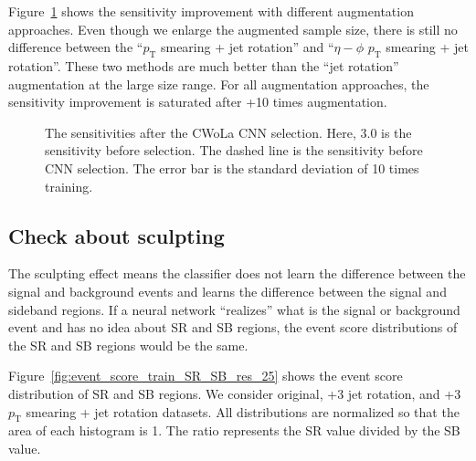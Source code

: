 \documentclass[12pt]{article}
\begin{document}
        Figure~\ref{fig:sensitivity_improvement_summary_aug_3_to_33_SB_3} shows the sensitivity improvement with different augmentation approaches. Even though we enlarge the augmented sample size, there is still no difference between the ``$p_{\text{T}}$ smearing + jet rotation'' and ``$\eta-\phi$ $p_{\text{T}}$ smearing + jet rotation''. These two methods are much better than the ``jet rotation'' augmentation at the large size range. For all augmentation approaches, the sensitivity improvement is saturated after +10 times augmentation.
        \begin{figure}[htpb]
            \centering
            \caption{The sensitivities after the CWoLa CNN selection. Here, $3.0$ is the sensitivity before selection. The dashed line is the sensitivity before CNN selection. The error bar is the standard deviation of 10 times training.}
            \label{fig:sensitivity_improvement_summary_aug_3_to_33_SB_3}
        \end{figure}
    \subsection{Check about sculpting}%
    \label{sub:check_about_sculpting}
        The sculpting effect means the classifier does not learn the difference between the signal and background events and learns the difference between the signal and sideband regions. If a neural network ``realizes'' what is the signal or background event and has no idea about SR and SB regions, the event score distributions of the SR and SB regions would be the same.

        Figure~\ref{fig:event_score_train_SR_SB_res_25} shows the event score distribution of SR and SB regions. We consider original, +3 jet rotation, and +3 $p_{\text{T}}$ smearing + jet rotation datasets. All distributions are normalized so that the area of each histogram is 1. The ratio represents the SR value divided by the SB value.
\end{document}
